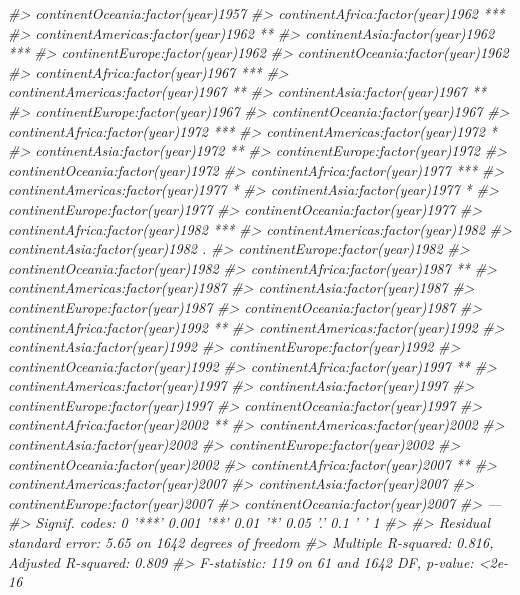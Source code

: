 \documentclass[]{book}
\newenvironment{Shaded}{\begin{snugshade}}{\end{snugshade}}
\newcommand{\CommentTok}[1]{\textcolor[rgb]{0.56,0.35,0.01}{\textit{#1}}}
\begin{document}
\begin{Shaded}
\begin{Highlighting}[]
\CommentTok{#> continentOceania:factor(year)1957     }
\CommentTok{#> continentAfrica:factor(year)1962   ***}
\CommentTok{#> continentAmericas:factor(year)1962 ** }
\CommentTok{#> continentAsia:factor(year)1962     ***}
\CommentTok{#> continentEurope:factor(year)1962      }
\CommentTok{#> continentOceania:factor(year)1962     }
\CommentTok{#> continentAfrica:factor(year)1967   ***}
\CommentTok{#> continentAmericas:factor(year)1967 ** }
\CommentTok{#> continentAsia:factor(year)1967     ** }
\CommentTok{#> continentEurope:factor(year)1967      }
\CommentTok{#> continentOceania:factor(year)1967     }
\CommentTok{#> continentAfrica:factor(year)1972   ***}
\CommentTok{#> continentAmericas:factor(year)1972 *  }
\CommentTok{#> continentAsia:factor(year)1972     ** }
\CommentTok{#> continentEurope:factor(year)1972      }
\CommentTok{#> continentOceania:factor(year)1972     }
\CommentTok{#> continentAfrica:factor(year)1977   ***}
\CommentTok{#> continentAmericas:factor(year)1977 *  }
\CommentTok{#> continentAsia:factor(year)1977     *  }
\CommentTok{#> continentEurope:factor(year)1977      }
\CommentTok{#> continentOceania:factor(year)1977     }
\CommentTok{#> continentAfrica:factor(year)1982   ***}
\CommentTok{#> continentAmericas:factor(year)1982    }
\CommentTok{#> continentAsia:factor(year)1982     .  }
\CommentTok{#> continentEurope:factor(year)1982      }
\CommentTok{#> continentOceania:factor(year)1982     }
\CommentTok{#> continentAfrica:factor(year)1987   ** }
\CommentTok{#> continentAmericas:factor(year)1987    }
\CommentTok{#> continentAsia:factor(year)1987        }
\CommentTok{#> continentEurope:factor(year)1987      }
\CommentTok{#> continentOceania:factor(year)1987     }
\CommentTok{#> continentAfrica:factor(year)1992   ** }
\CommentTok{#> continentAmericas:factor(year)1992    }
\CommentTok{#> continentAsia:factor(year)1992        }
\CommentTok{#> continentEurope:factor(year)1992      }
\CommentTok{#> continentOceania:factor(year)1992     }
\CommentTok{#> continentAfrica:factor(year)1997   ** }
\CommentTok{#> continentAmericas:factor(year)1997    }
\CommentTok{#> continentAsia:factor(year)1997        }
\CommentTok{#> continentEurope:factor(year)1997      }
\CommentTok{#> continentOceania:factor(year)1997     }
\CommentTok{#> continentAfrica:factor(year)2002   ** }
\CommentTok{#> continentAmericas:factor(year)2002    }
\CommentTok{#> continentAsia:factor(year)2002        }
\CommentTok{#> continentEurope:factor(year)2002      }
\CommentTok{#> continentOceania:factor(year)2002     }
\CommentTok{#> continentAfrica:factor(year)2007   ** }
\CommentTok{#> continentAmericas:factor(year)2007    }
\CommentTok{#> continentAsia:factor(year)2007        }
\CommentTok{#> continentEurope:factor(year)2007      }
\CommentTok{#> continentOceania:factor(year)2007     }
\CommentTok{#> ---}
\CommentTok{#> Signif. codes:  0 '***' 0.001 '**' 0.01 '*' 0.05 '.' 0.1 ' ' 1}
\CommentTok{#> }
\CommentTok{#> Residual standard error: 5.65 on 1642 degrees of freedom}
\CommentTok{#> Multiple R-squared:  0.816,  Adjusted R-squared:  0.809 }
\CommentTok{#> F-statistic:  119 on 61 and 1642 DF,  p-value: <2e-16}
\end{Highlighting}
\end{Shaded}
\end{document}
